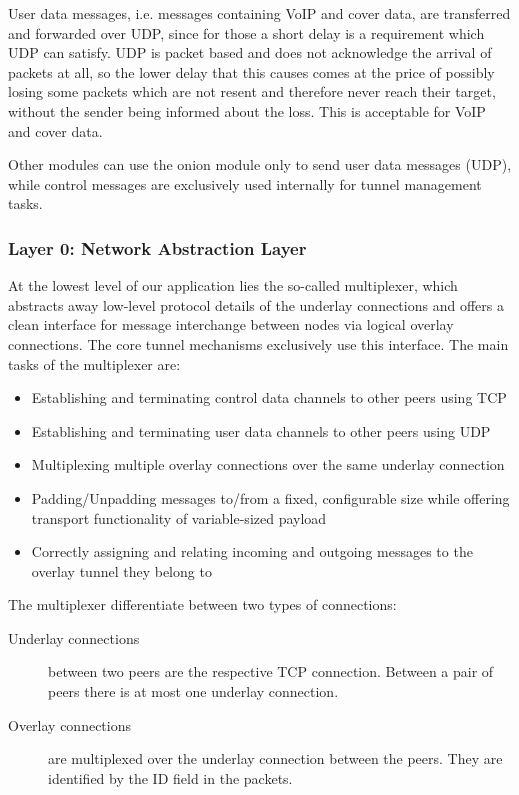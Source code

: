 \documentclass{article}
\begin{document}
User data messages, i.e. messages containing VoIP and cover data, are transferred and forwarded over UDP, since for those a short delay is a requirement which UDP can satisfy. UDP is packet based and does not acknowledge the arrival of packets at all, so the lower delay that this causes comes at the price of possibly losing some packets which are not resent and therefore never reach their target, without the sender being informed about the loss. This is acceptable for VoIP and cover data.

Other modules can use the onion module only to send user data messages (UDP), while control messages are exclusively used internally for tunnel management tasks.

\subsubsection{Layer 0: Network Abstraction Layer}

At the lowest level of our application lies the so-called multiplexer, which abstracts away
low-level protocol details of the underlay connections and offers a clean interface for message
interchange between nodes via logical overlay connections. The core tunnel mechanisms exclusively
use this interface. The main tasks of the multiplexer are:
\begin{itemize}
	\item Establishing and terminating control data channels to other peers using TCP
	\item Establishing and terminating user data channels to other peers using UDP
	\item Multiplexing multiple overlay connections over the same underlay connection
	\item Padding/Unpadding messages to/from a fixed, configurable size while offering transport functionality of variable-sized payload
	\item Correctly assigning and relating incoming and outgoing messages to the overlay tunnel they belong to
\end{itemize}

The multiplexer differentiate between two types of connections:
\begin{description}
	\item[Underlay connections] between two peers are the respective TCP connection. Between a pair of peers there is at most one underlay connection.
	\item[Overlay connections] are multiplexed over the underlay connection between the peers. They are identified by the ID field in the packets.
\end{description}
\end{document}
